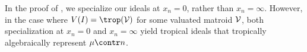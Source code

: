 In the proof of , we specialize our ideals at $x_n=0$, rather than $x_n=\infty$. However, in the case where $V(I)=\trop(\sV)$ for some valuated matroid $\mathcal{V}$, both specialization at $x_n=0$ and $x_n=\infty$ yield tropical ideals that tropically algebraically represent $\mu\contr n$.





